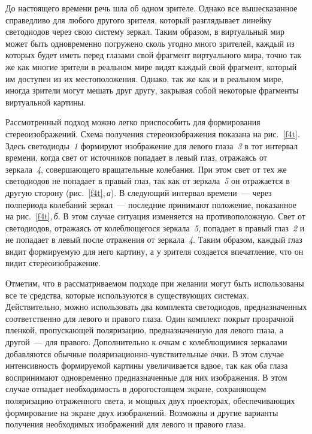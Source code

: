 \begin{multicols}{2}
  До настоящего времени речь шла об одном зрителе. Однако все вышесказанное 
справедливо для любого другого зрителя, который разглядывает линейку светодиодов 
через свою систему зеркал. Таким образом, в виртуальный мир может быть одновременно 
погружено сколь угодно много зрителей, каждый из которых будет иметь перед глазами 
свой фрагмент виртуального мира, точно так же как многие зрители в реальном мире 
видят каждый свой фрагмент, который им доступен из их местоположения. Однако, так 
же как и в реальном мире, иногда зрители могут мешать друг другу, закрывая собой 
некоторые фрагменты виртуальной картины. 
  
  Рассмотренный подход можно легко приспособить для формирования 
стереоизображений. Схема получения стереоизображения показана на рис.~\ref{f4t}. 
Здесь светодиоды~\textit{1} формируют изображение для левого глаза~\textit{3} в тот 
интервал времени, когда свет от источников попадает в левый глаз, отражаясь от 
зеркала~\textit{4}, совершающего вращательные колебания. При этом свет от тех же 
светодиодов не попадает в правый глаз, так как от зеркала~\textit{5} он отражается в 
другую сторону (рис.~\ref{f4t},\,\textit{а}). В следующий интервал времени~--- через 
полпериода колебаний зеркал~--- последние принимают положение, показанное на 
рис.~\ref{f4t},\,\textit{б}. В этом случае ситуация изменяется на противоположную. Свет 
от светодиодов, отражаясь от колеблющегося зеркала~\textit{5}, попадает в правый 
глаз~\textit{2} и не попадает в левый после отражения от зеркала~\textit{4}. Таким 
образом, каждый глаз видит формируемую для него картину, а у зрителя создается 
впечатление, что он видит стереоизображение.
  
  Отметим, что в рассматриваемом подходе при желании могут быть использованы все те 
средства, которые используются в существующих сис\-те\-мах. Действительно, можно 
использовать два комплекта светодиодов, предназначенных соответственно для левого и 
правого глаза. Один комплект покрыт прозрачной пленкой, пропускающей поляризацию, 
предназначенную для левого глаза, а другой~--- для правого. Дополнительно к очкам с 
колеблющимися зеркалами добавляются обычные поляризационно-чувствительные очки. 
В этом случае интенсивность формируемой картины увеличивается вдвое, так как оба 
глаза воспринимают одновременно предназначенные для них изоб\-ра\-же\-ния. В этом случае 
отпадает необходимость в дорогостоящем экране, сохраняющем поляризацию 
отраженного света, и мощных двух проекторах, обеспечивающих формирование на экране 
двух изображений. Возможны и другие варианты получения необходимых изображений 
для левого и правого глаза. 
  

\end{multicols}
